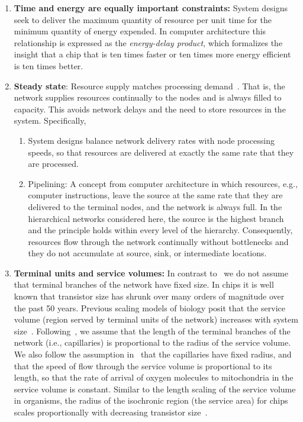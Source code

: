 \documentclass[12pt]{article}
\begin{document}
\begin{enumerate}
\item {\bf Time and energy are equally important constraints:} 
  System designs seek to deliver the maximum quantity of
  resource per unit time for the minimum quantity of energy expended. 
  In computer architecture this relationship is expressed as the
  \emph{energy-delay product}, which formalizes the insight that a
  chip that is ten times faster or ten times more energy efficient is
  ten times better. 

\item {\bf Steady state}: Resource supply matches processing
  demand~\cite{banavar10}.  That is, the network supplies resources continually
  to the nodes and is always filled to capacity.  This avoids network
  delays and the need to store resources in the system. Specifically,

  \begin{enumerate}

\item System designs balance network delivery rates with node processing
  speeds, so that resources are delivered at exactly the same rate that they
  are processed.

\item Pipelining: A concept from computer architecture in which resources,
  e.g., computer instructions, leave the source at the same rate that they are
  delivered to the terminal nodes, and the network is always full.  In the
  hierarchical networks considered here, the source is the highest branch
  and the principle holds within every level of the hierarchy.
  Consequently, resources flow through the network continually 
  without bottlenecks and they do not accumulate at source, sink, or intermediate locations.
  \end{enumerate}

\item {\bf Terminal units and service volumes:} In contrast to~\cite{west97} we do not assume that terminal branches of the network have fixed size.   In
  chips it is well known that transistor size has shrunk over many orders of
  magnitude over the past 50 years.   Previous scaling models of biology posit that the service volume  (region served by terminal units of the network) increases with
  system size~\cite{west97, banavar10}.  Following~\cite{banavar10}, we assume that the length of the terminal branches of the network (i.e., capillaries) is
  proportional to the radius of the service volume.  We also follow the assumption in~\cite{banavar10} that the capillaries have fixed radius, and that the speed of flow through the service volume is proportional to its length, so that the rate of arrival of oxygen molecules to mitochondria in the service volume is constant.  Similar to the length scaling of the service volume in organisms, the radius of the isochronic region (the service area) for chips scales proportionally with decreasing transistor size~\cite{moses08}.
\end{enumerate}
\end{document}

